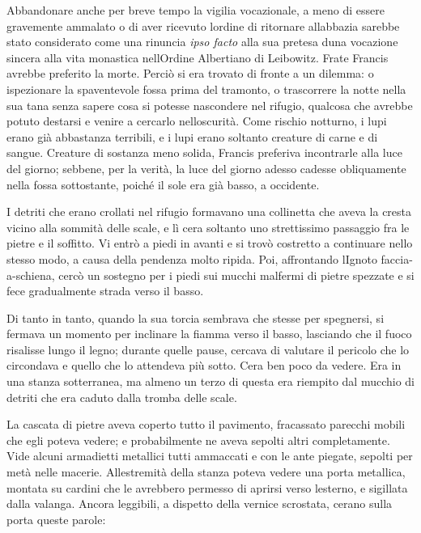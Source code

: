Abbandonare anche per breve tempo la vigilia vocazionale, a meno di
essere gravemente ammalato o di aver ricevuto l\textquotesingle ordine
di ritornare all\textquotesingle abbazia sarebbe stato considerato come
una rinuncia \emph{ipso facto} alla sua pretesa d\textquotesingle una
vocazione sincera alla vita monastica nell\textquotesingle Ordine
Albertiano di Leibowitz. Frate Francis avrebbe preferito la morte.
Perciò si era trovato di fronte a un dilemma: o ispezionare la
spaventevole fossa prima del tramonto, o trascorrere la notte nella sua
tana senza sapere cosa si potesse nascondere nel rifugio, qualcosa che
avrebbe potuto destarsi e venire a cercarlo
nell\textquotesingle oscurità. Come rischio notturno, i lupi erano già
abbastanza terribili, e i lupi erano soltanto creature di carne e di
sangue. Creature di sostanza meno solida, Francis preferiva incontrarle
alla luce del giorno; sebbene, per la verità, la luce del giorno adesso
cadesse obliquamente nella fossa sottostante, poiché il sole era già
basso, a occidente.

I detriti che erano crollati nel rifugio formavano una collinetta che
aveva la cresta vicino alla sommità delle scale, e lì
c\textquotesingle era soltanto uno strettissimo passaggio fra le pietre
e il soffitto. Vi entrò a piedi in avanti e si trovò costretto a
continuare nello stesso modo, a causa della pendenza molto ripida. Poi,
affrontando l\textquotesingle Ignoto faccia-a-schiena, cercò un sostegno
per i piedi sui mucchi malfermi di pietre spezzate e si fece
gradualmente strada verso il basso.

Di tanto in tanto, quando la sua torcia sembrava che stesse per
spegnersi, si fermava un momento per inclinare la fiamma verso il basso,
lasciando che il fuoco risalisse lungo il legno; durante quelle pause,
cercava di valutare il pericolo che lo circondava e quello che lo
attendeva più sotto. C\textquotesingle era ben poco da vedere. Era in
una stanza sotterranea, ma almeno un terzo di questa era riempito dal
mucchio di detriti che era caduto dalla tromba delle scale.

La cascata di pietre aveva coperto tutto il pavimento, fracassato
parecchi mobili che egli poteva vedere; e probabilmente ne aveva sepolti
altri completamente. Vide alcuni armadietti metallici tutti ammaccati e
con le ante piegate, sepolti per metà nelle macerie.
All\textquotesingle estremità della stanza poteva vedere una porta
metallica, montata su cardini che le avrebbero permesso di aprirsi verso
l\textquotesingle esterno, e sigillata dalla valanga. Ancora leggibili,
a dispetto della vernice scrostata, c\textquotesingle erano sulla porta
queste parole:

